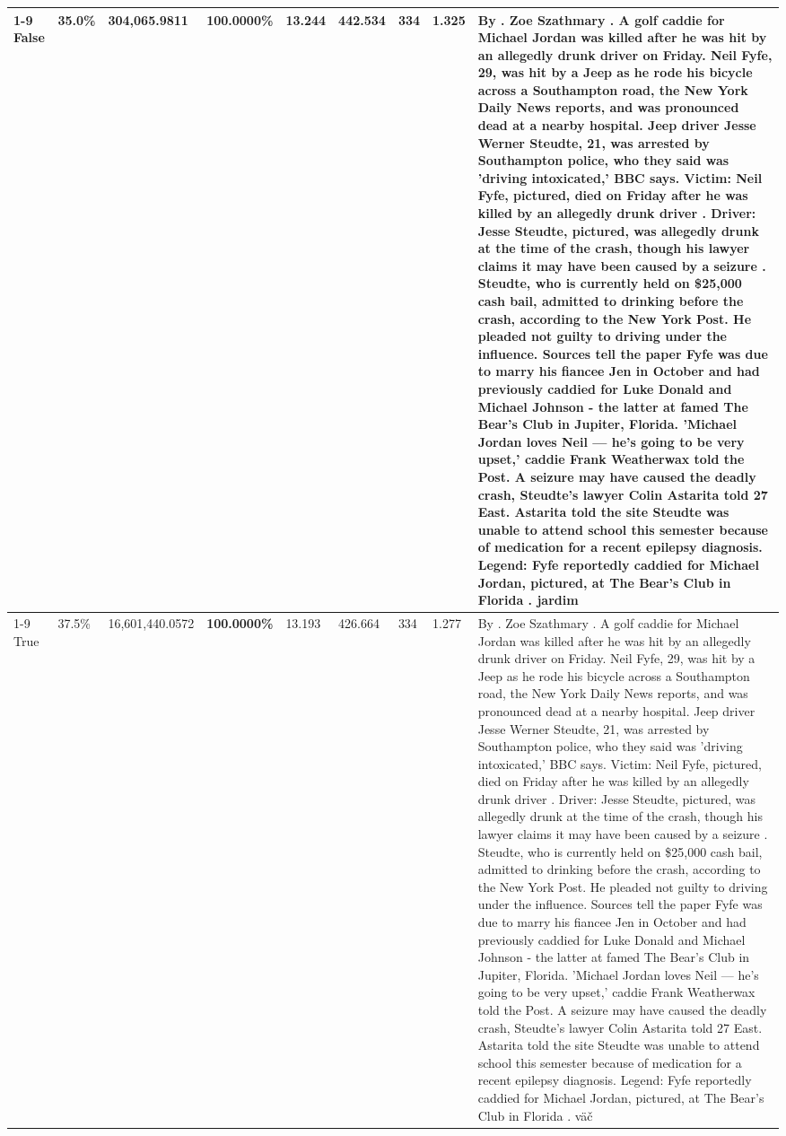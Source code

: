 \begin{table}[H]
\begin{tabular}{lllrlllll}
\cline{1-9}
False & 35.0\% & 304,065.9811 & \bfseries \color{red} 100.0000\% & 13.244 & 442.534 & 334 & 1.325 & By . Zoe Szathmary . A golf caddie for Michael Jordan was killed after he was hit by an allegedly drunk driver on Friday. Neil Fyfe, 29, was hit by a Jeep as he rode his bicycle across a Southampton road, the New York Daily News reports, and was pronounced dead at a nearby hospital. Jeep driver Jesse Werner Steudte, 21, was arrested by Southampton police, who they said was 'driving intoxicated,' BBC says. Victim: Neil Fyfe, pictured, died on Friday after he was killed by an allegedly drunk driver . Driver: Jesse Steudte, pictured, was allegedly drunk at the time of the crash, though his lawyer claims it may have been caused by a seizure . Steudte, who is currently held on \$25,000 cash bail, admitted to drinking before the crash, according to the New York Post. He pleaded not guilty to driving under the influence. Sources tell the paper Fyfe was due to marry his fiancee Jen in October and had previously caddied for Luke Donald and Michael Johnson - the latter at famed The Bear's Club in Jupiter, Florida. 'Michael Jordan loves Neil — he’s going to be very upset,' caddie Frank Weatherwax told the Post. A seizure may have caused the deadly crash, Steudte's lawyer Colin Astarita told 27 East. Astarita told the site Steudte was unable to attend school this semester because of medication for a recent epilepsy diagnosis. Legend: Fyfe reportedly caddied for Michael Jordan, pictured, at The Bear's Club in Florida . jardim \\
\cline{1-9}
True & 37.5\% & 16,601,440.0572 & \bfseries \color{red} 100.0000\% & 13.193 & 426.664 & 334 & 1.277 & By . Zoe Szathmary . A golf caddie for Michael Jordan was killed after he was hit by an allegedly drunk driver on Friday. Neil Fyfe, 29, was hit by a Jeep as he rode his bicycle across a Southampton road, the New York Daily News reports, and was pronounced dead at a nearby hospital. Jeep driver Jesse Werner Steudte, 21, was arrested by Southampton police, who they said was 'driving intoxicated,' BBC says. Victim: Neil Fyfe, pictured, died on Friday after he was killed by an allegedly drunk driver . Driver: Jesse Steudte, pictured, was allegedly drunk at the time of the crash, though his lawyer claims it may have been caused by a seizure . Steudte, who is currently held on \$25,000 cash bail, admitted to drinking before the crash, according to the New York Post. He pleaded not guilty to driving under the influence. Sources tell the paper Fyfe was due to marry his fiancee Jen in October and had previously caddied for Luke Donald and Michael Johnson - the latter at famed The Bear's Club in Jupiter, Florida. 'Michael Jordan loves Neil — he’s going to be very upset,' caddie Frank Weatherwax told the Post. A seizure may have caused the deadly crash, Steudte's lawyer Colin Astarita told 27 East. Astarita told the site Steudte was unable to attend school this semester because of medication for a recent epilepsy diagnosis. Legend: Fyfe reportedly caddied for Michael Jordan, pictured, at The Bear's Club in Florida . väč \\

\end{tabular}
\end{table}
